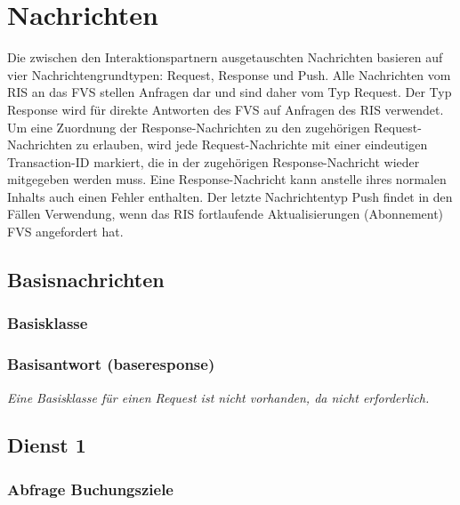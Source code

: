 \chapter{Nachrichten}
\label{cha:Nachrichten}
Die zwischen den Interaktionspartnern ausgetauschten Nachrichten basieren auf vier Nachrichtengrundtypen: Request, Response und Push. Alle Nachrichten vom RIS an das FVS stellen Anfragen dar und sind daher vom Typ Request. Der Typ Response wird für direkte Antworten des FVS auf Anfragen des RIS verwendet. Um eine Zuordnung der Response-Nachrichten zu den zugehörigen Request-Nachrichten zu erlauben, wird jede Request-Nachrichte mit einer eindeutigen Transaction-ID markiert, die in der zugehörigen Response-Nachricht wieder mitgegeben werden muss. Eine Response-Nachricht kann anstelle ihres normalen Inhalts auch einen Fehler enthalten. Der letzte Nachrichtentyp Push findet in den Fällen Verwendung, wenn das RIS fortlaufende Aktualisierungen (Abonnement) FVS angefordert hat. 

\section{Basisnachrichten}
\label{sec:Nachrichten:Basisnachrichten}

\subsection*{Basisklasse}


\subsection*{Basisantwort (baseresponse)}


\medskip

\textit{Eine Basisklasse für einen Request ist nicht vorhanden, da nicht erforderlich.}

\section{Dienst 1}
\label{sec:Nachrichten:Dienst1}

\subsection*{Abfrage Buchungsziele}
\label{subsec:Nachrichten:Dienst1:BookingTargets}




